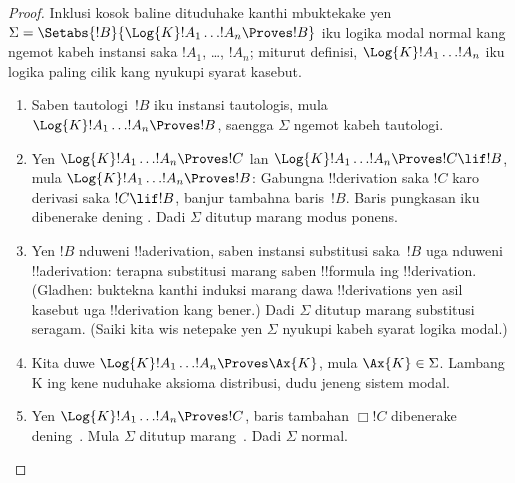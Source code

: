 \documentclass[../../../include/open-logic-section]{subfiles}
\begin{document}
\begin{proof}
Inklusi kosok baline dituduhake kanthi mbuktekake yen
  $\Sigma = \Setabs{!B}{\Log{K} !A_1 \dots !A_n \Proves !B }$ iku
  logika modal normal kang ngemot kabeh instansi saka $!A_1$,
  \dots, $!A_n$; miturut definisi, $\Log{K} !A_1 \dots !A_n$
  iku logika paling cilik kang nyukupi syarat kasebut.
  \begin{enumerate}
    \item Saben tautologi~$!B$ iku instansi tautologis, mula
      $\Log{K}!A_1\dots!A_n \Proves !B$, saengga $\Sigma$ ngemot kabeh
      tautologi.
    \item Yen $\Log{K}!A_1\dots!A_n \Proves !C$ lan
      $\Log{K}!A_1\dots!A_n \Proves !C \lif !B$, mula
      $\Log{K}!A_1\dots!A_n \Proves !B$: Gabungna !!{derivation}
      saka $!C$ karo derivasi saka $!C \lif !B$, banjur tambahna
      baris~$!B$. Baris pungkasan iku dibenerake dening \MP{}.
      Dadi $\Sigma$ ditutup marang modus ponens.
    \item Yen $!B$ nduweni !!a{derivation}, saben instansi substitusi
      saka~$!B$ uga nduweni !!a{derivation}: terapna substitusi marang
      saben !!{formula} ing !!{derivation}. (Gladhen: buktekna kanthi
      induksi marang dawa !!{derivation}s yen asil kasebut uga
      !!{derivation} kang bener.) Dadi $\Sigma$ ditutup marang
      substitusi seragam. (Saiki kita wis netepake yen $\Sigma$
      nyukupi kabeh syarat logika modal.)
    \item Kita duwe $\Log{K}!A_1\dots!A_n \Proves \Ax{K}$, mula
      $\Ax{K} \in \Sigma$. Lambang K ing kene nuduhake aksioma distribusi, dudu jeneng sistem modal.
    \item Yen $\Log{K}!A_1\dots!A_n \Proves !C$, baris tambahan
      $\Box !C$ dibenerake dening~\Nec. Mula $\Sigma$ ditutup
      marang~\Nec. Dadi $\Sigma$ normal.
  \end{enumerate}
\end{proof}
\end{document}
